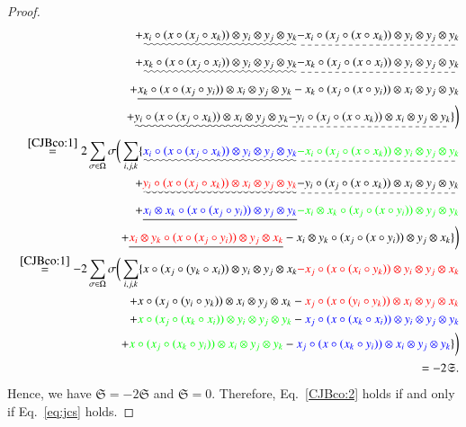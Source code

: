 \documentclass[12pt, reqno, a4paper]{amsart}
\theoremstyle{definition}
\begin{document}
\begin{proof}
\begin{eqnarray*}
		&&\quad\quad + \uwave{ x_i \circ (x \circ (x_j \circ x_k)) \otimes y_i \otimes y_j \otimes y_k} \dashuline{ - x_i \circ (x_j \circ (x \circ x_k)) \otimes y_i \otimes y_j \otimes y_k} \\
		&&\quad\quad + \uwave{x_k \circ (x \circ (x_j \circ x_i)) \otimes y_i \otimes y_j \otimes y_k} \dashuline{ - x_k \circ (x_j \circ (x \circ x_i)) \otimes y_i \otimes y_j \otimes y_k} \\
		&&\quad\quad + \uline{ x_k \circ (x \circ (x_j \circ y_i)) \otimes x_i \otimes y_j \otimes y_k} - x_k \circ (x_j \circ (x \circ y_i)) \otimes x_i \otimes y_j \otimes y_k \\
		&&\quad\quad + \uwave{y_i \circ (x \circ (x_j \circ x_k)) \otimes x_i \otimes y_j \otimes y_k} \dashuline{ - y_i \circ (x_j \circ (x \circ x_k)) \otimes x_i \otimes y_j \otimes y_k} \} \bigg) \\
		&&\overset{\eqref{CJBco:1}}{=} 2\sum_{\sigma \in \Omega}\sigma\bigg( \sum_{i,j, k} \{ \uwave{ \textcolor{blue}{x_i \circ (x \circ (x_j \circ x_k)) \otimes y_i \otimes y_j \otimes y_k} } \dashuline{ \textcolor{green}{ - x_i \circ (x_j \circ (x \circ x_k)) \otimes y_i \otimes y_j \otimes y_k} } \\
		&&\quad\quad + \uwave{ \textcolor{red}{ y_i \circ (x \circ (x_j \circ x_k)) \otimes x_i \otimes y_j \otimes y_k} } \dashuline{ - y_i \circ (x_j \circ (x \circ x_k)) \otimes x_i \otimes y_j \otimes y_k} \\
		&&\quad\quad + \uline{ \textcolor{blue}{x_i \otimes x_k \circ (x \circ (x_j \circ y_i)) \otimes y_j \otimes y_k} } \textcolor{green}{ - x_i \otimes x_k \circ (x_j \circ (x \circ y_i)) \otimes y_j \otimes y_k} \\
		&&\quad\quad + \uline{ \textcolor{red}{x_i \otimes y_k \circ (x \circ (x_j \circ y_i)) \otimes y_j \otimes x_k} } - x_i \otimes y_k \circ (x_j \circ (x \circ y_i)) \otimes y_j \otimes x_k \} \bigg) \\
		&&\overset{\eqref{CJBco:1}}{=} -2\sum_{\sigma \in \Omega}\sigma\bigg( \sum_{i,j, k} \{ x \circ (x_j \circ (y_k \circ x_i)) \otimes y_i \otimes y_j \otimes x_k \textcolor{red}{ - x_j \circ (x \circ (x_i \circ y_k)) \otimes y_i \otimes y_j \otimes x_k} \\
		&&\quad\quad + x \circ (x_j \circ (y_i \circ y_k)) \otimes x_i \otimes y_j \otimes x_k-\textcolor{red}{ x_j \circ (x \circ (y_i \circ y_k)) \otimes x_i \otimes y_j \otimes x_k} \\
		&&\quad\quad + \textcolor{green}{ x \circ (x_j \circ (x_k \circ x_i)) \otimes y_i \otimes y_j \otimes y_k}-\textcolor{blue}{ x_j \circ (x \circ (x_k \circ x_i)) \otimes y_i \otimes y_j \otimes y_k} \\
		&&\quad\quad + \textcolor{green}{x \circ (x_j \circ (x_k \circ y_i)) \otimes x_i \otimes y_j \otimes y_k} -\textcolor{blue}{ x_j \circ (x \circ (x_k \circ y_i)) \otimes x_i \otimes y_j \otimes y_k} \} \bigg) \\
		&&\;\overset{ }{=}-2 \mathfrak{S}.
	\end{eqnarray*}
	Hence, we have $\mathfrak{S} = -2\mathfrak{S}$ and $\mathfrak{S} = 0$.
	Therefore, Eq.~\eqref{CJBco:2} holds if and only if Eq.~\eqref{eq:jcs} holds.



\end{proof}
\end{document}

